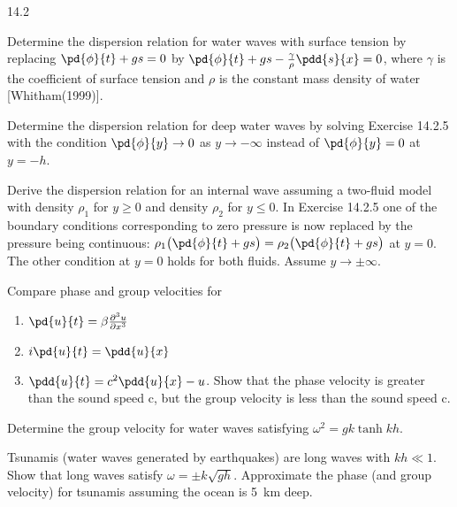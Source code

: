 \begin{exercises}{14.2}
\item Determine the dispersion relation for water waves with surface tension by replacing $\pd{\phi}{t} + gs = 0$ by $\pd{\phi}{t} + gs - \frac{\gamma}{\rho}\pdd{s}{x} = 0$, where $\gamma$ is the coefficient of surface tension and $\rho$ is the constant mass density of water [Whitham(1999)].

\item[\starred] Determine the dispersion relation for deep water waves by solving Exercise 14.2.5 with the condition $\pd{\phi}{y} \to 0$ as $y \to -\infty$ instead of $\pd{\phi}{y} = 0$ at $y = -h$.

\item Derive the dispersion relation for an internal wave assuming a two-fluid model with density $\rho_1$ for $y \ge 0$ and density $\rho_2$ for $y \le 0$.  In Exercise 14.2.5 one of the boundary conditions corresponding to zero pressure is now replaced by the pressure being continuous: $\rho_1\bigl(\pd{\phi}{t} + gs\bigr) = \rho_2\bigl(\pd{\phi}{t} + gs\bigr)$ at $y = 0$.  The other condition at $y = 0$ holds for both fluids.  Assume $y \to \pm\infty$.

\item Compare phase and group velocities for
\begin{enumerate}
\item[(a)] $\pd{u}{t} = \beta\frac{\partial^3 u}{\partial x^3}$
\item[(b)] $i\pd{u}{t} = \pdd{u}{x}$
\item[(c)] $\pdd{u}{t} = c^2\pdd{u}{x} - u$.  Show that the phase velocity is greater than the sound speed c, but the group velocity is less than the sound speed c.
\end{enumerate}

\item Determine the group velocity for water waves satisfying $\omega^2 = gk\tanh kh$.

\item Tsunamis (water waves generated by earthquakes) are long waves with $kh \ll 1$.  Show that long waves satisfy $\omega = \pm k\sqrt{gh}$.  Approximate the phase (and group velocity) for tsunamis assuming the ocean is 5~km deep.
\end{exercises}
